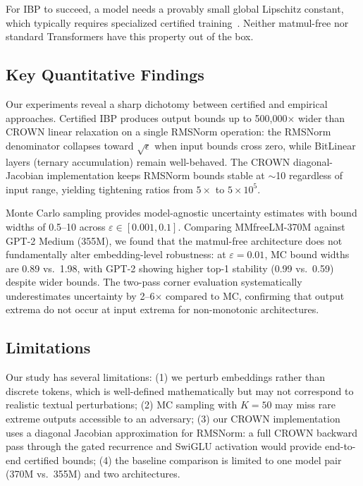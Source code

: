 \documentclass[11pt]{article}
\begin{document}
For IBP to succeed, a model needs a provably small global Lipschitz constant, which typically requires specialized certified training~\cite{gowal2018effectiveness,zhang2019towards}. Neither matmul-free nor standard Transformers have this property out of the box.

\subsection{Key Quantitative Findings}

Our experiments reveal a sharp dichotomy between certified and empirical approaches. Certified IBP produces output bounds up to 500,000$\times$ wider than CROWN linear relaxation on a single RMSNorm operation: the RMSNorm denominator collapses toward $\sqrt{\epsilon}$ when input bounds cross zero, while BitLinear layers (ternary accumulation) remain well-behaved. The CROWN diagonal-Jacobian implementation keeps RMSNorm bounds stable at $\sim$10 regardless of input range, yielding tightening ratios from $5\times$ to $5\times 10^5$.

Monte Carlo sampling provides model-agnostic uncertainty estimates with bound widths of 0.5--10 across $\varepsilon \in [0.001, 0.1]$. Comparing MMfreeLM-370M against GPT-2 Medium (355M), we found that the matmul-free architecture does not fundamentally alter embedding-level robustness: at $\varepsilon{=}0.01$, MC bound widths are 0.89 vs.\ 1.98, with GPT-2 showing higher top-1 stability (0.99 vs.\ 0.59) despite wider bounds. The two-pass corner evaluation systematically underestimates uncertainty by 2--6$\times$ compared to MC, confirming that output extrema do not occur at input extrema for non-monotonic architectures.

\subsection{Limitations}

Our study has several limitations: (1) we perturb embeddings rather than discrete tokens, which is well-defined mathematically but may not correspond to realistic textual perturbations; (2) MC sampling with $K{=}50$ may miss rare extreme outputs accessible to an adversary; (3) our CROWN implementation uses a diagonal Jacobian approximation for RMSNorm: a full CROWN backward pass through the gated recurrence and SwiGLU activation would provide end-to-end certified bounds; (4) the baseline comparison is limited to one model pair (370M vs.\ 355M) and two architectures.
\end{document}
